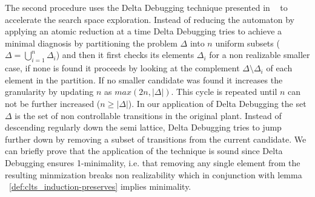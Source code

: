 The second procedure uses the Delta Debugging technique presented in ~\cite{DBLP:journals/tse/ZellerH02} to accelerate the search space exploration. Instead of reducing the automaton by applying an atomic reduction at a time Delta Debugging tries to achieve a minimal diagnosis by partitioning the problem $\Delta$ into $n$ uniform subsets ($\Delta = \bigcup_{i=1}^n \Delta_i $) and then it first checks its elements $\Delta_i$ for a non realizable smaller case, if none is found it proceeds by looking at the complement $\Delta \setminus \Delta_i$ of each element in the partition. If no smaller candidate was found it increases the granularity by updating $n$ as $max(2n,|\Delta|)$. This cycle is repeated until $n$ can not be further increased ($n \geq |\Delta|$). 
In our application of Delta Debugging the set $\Delta$ is the set of non controllable transitions in the original plant. Instead of descending regularly down the semi lattice, Delta Debugging tries to jump further down by removing a subset of transitions from the current candidate. We can briefly prove that the application of the technique is sound since Delta Debugging ensures 1-minimality, i.e. that removing any single element from the resulting minmization breaks non realizability which in conjunction with lemma ~\ref{def:clts_induction-preserves} implies minimality.
